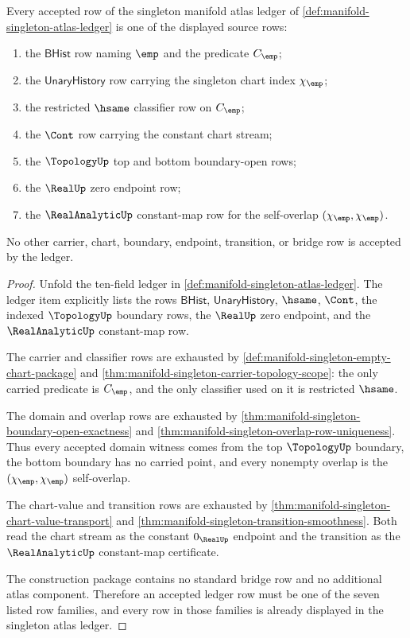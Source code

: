 \begin{theorem}
\label{thm:manifold-singleton-ledger-row-exhaustion}
Every accepted row of the singleton manifold atlas ledger of
\autoref{def:manifold-singleton-atlas-ledger} is one of the displayed source
rows:
\begin{enumerate}
\item the $\mathsf{BHist}$ row naming $\emp$ and the predicate $C_{\emp}$;
\item the $\mathsf{UnaryHistory}$ row carrying the singleton chart index
$\chi_{\emp}$;
\item the restricted $\hsame$ classifier row on $C_{\emp}$;
\item the $\Cont$ row carrying the constant chart stream;
\item the $\TopologyUp$ top and bottom boundary-open rows;
\item the $\RealUp$ zero endpoint row;
\item the $\RealAnalyticUp$ constant-map row for the self-overlap
$(\chi_{\emp},\chi_{\emp})$.
\end{enumerate}
No other carrier, chart, boundary, endpoint, transition, or bridge row is
accepted by the ledger.
\end{theorem}
\begin{proof}
Unfold the ten-field ledger in
\autoref{def:manifold-singleton-atlas-ledger}. The ledger item explicitly
lists the rows
$\mathsf{BHist}$, $\mathsf{UnaryHistory}$, $\hsame$, $\Cont$, the indexed
$\TopologyUp$ boundary rows, the $\RealUp$ zero endpoint, and the
$\RealAnalyticUp$ constant-map row.

The carrier and classifier rows are exhausted by
\autoref{def:manifold-singleton-empty-chart-package} and
\autoref{thm:manifold-singleton-carrier-topology-scope}: the only carried
predicate is $C_{\emp}$, and the only classifier used on it is restricted
$\hsame$.

The domain and overlap rows are exhausted by
\autoref{thm:manifold-singleton-boundary-open-exactness} and
\autoref{thm:manifold-singleton-overlap-row-uniqueness}. Thus every accepted
domain witness comes from the top $\TopologyUp$ boundary, the bottom boundary
has no carried point, and every nonempty overlap is the
$(\chi_{\emp},\chi_{\emp})$ self-overlap.

The chart-value and transition rows are exhausted by
\autoref{thm:manifold-singleton-chart-value-transport} and
\autoref{thm:manifold-singleton-transition-smoothness}. Both read the chart
stream as the constant $0_{\RealUp}$ endpoint and the transition as the
$\RealAnalyticUp$ constant-map certificate.

The construction package contains no standard bridge row and no additional
atlas component. Therefore an accepted ledger row must be one of the seven
listed row families, and every row in those families is already displayed in
the singleton atlas ledger.
\end{proof}
